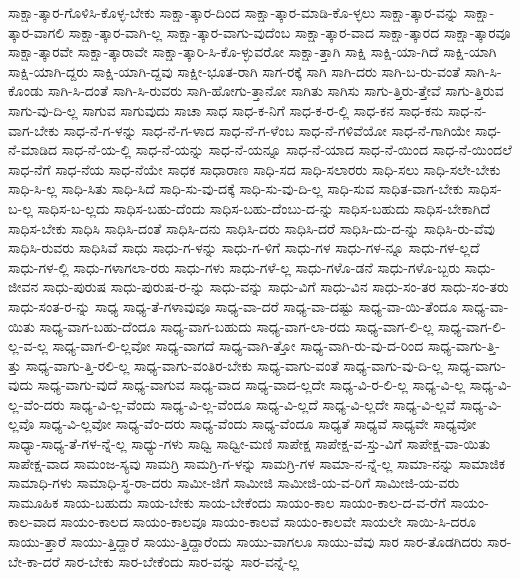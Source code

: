 {ಸಾಕ್ಷಾ-ತ್ಕಾರ-ಗೊಳಿಸಿ-ಕೊಳ್ಳ-ಬೇಕು
ಸಾಕ್ಷಾ-ತ್ಕಾರ-ದಿಂದ
ಸಾಕ್ಷಾ-ತ್ಕಾರ-ಮಾಡಿ-ಕೊ-ಳ್ಳಲು
ಸಾಕ್ಷಾ-ತ್ಕಾರ-ವನ್ನು
ಸಾಕ್ಷಾ-ತ್ಕಾರ-ವಾಗಲಿ
ಸಾಕ್ಷಾ-ತ್ಕಾರ-ವಾಗಿ-ಲ್ಲ
ಸಾಕ್ಷಾ-ತ್ಕಾರ-ವಾಗು-ವುದೆಂಬ
ಸಾಕ್ಷಾ-ತ್ಕಾರ-ವಾದ
ಸಾಕ್ಷಾ-ತ್ಕಾರದ
ಸಾಕ್ಷಾ-ತ್ಕಾರವೂ
ಸಾಕ್ಷಾ-ತ್ಕಾರವೇ
ಸಾಕ್ಷಾ-ತ್ಕಾರಾವೇ
ಸಾಕ್ಷಾ-ತ್ಕಾರಿ-ಸಿ-ಕೊ-ಳ್ಳುವರೋ
ಸಾಕ್ಷಾ-ತ್ತಾಗಿ
ಸಾಕ್ಷಿ
ಸಾಕ್ಷಿ-ಯಾ-ಗಿದೆ
ಸಾಕ್ಷಿ-ಯಾಗಿ
ಸಾಕ್ಷಿ-ಯಾಗಿ-ದ್ದರು
ಸಾಕ್ಷಿ-ಯಾಗಿ-ದ್ದವು
ಸಾಕ್ಷೀ-ಭೂತ-ರಾಗಿ
ಸಾಗ-ರಕ್ಕೆ
ಸಾಗಿ
ಸಾಗಿ-ದರು
ಸಾಗಿ-ಬ-ರು-ವಂತೆ
ಸಾಗಿ-ಸಿ-ಕೊಂಡು
ಸಾಗಿ-ಸಿ-ದಂತೆ
ಸಾಗಿ-ಸಿ-ರುವರು
ಸಾಗಿ-ಹೋಗು-ತ್ತಾನೋ
ಸಾಗಿತು
ಸಾಗಿಸು
ಸಾಗು-ತ್ತಿರು-ತ್ತೇವೆ
ಸಾಗು-ತ್ತಿರುವ
ಸಾಗು-ವು-ದಿ-ಲ್ಲ
ಸಾಗುವ
ಸಾಗುವುದು
ಸಾಚಾ
ಸಾಧ
ಸಾಧ-ಕ-ನಿಗೆ
ಸಾಧ-ಕ-ರ-ಲ್ಲಿ
ಸಾಧ-ಕನ
ಸಾಧ-ಕನು
ಸಾಧ-ನ-ವಾಗ-ಬೇಕು
ಸಾಧ-ನೆ-ಗ-ಳನ್ನು
ಸಾಧ-ನೆ-ಗ-ಳಾದ
ಸಾಧ-ನೆ-ಗ-ಳೆಂಬ
ಸಾಧ-ನೆ-ಗಳಿವೆಯೋ
ಸಾಧ-ನೆ-ಗಾಗಿಯೇ
ಸಾಧ-ನೆ-ಮಾಡಿದ
ಸಾಧ-ನೆ-ಯ-ಲ್ಲಿ
ಸಾಧ-ನೆ-ಯನ್ನು
ಸಾಧ-ನೆ-ಯನ್ನೂ
ಸಾಧ-ನೆ-ಯಾದ
ಸಾಧ-ನೆ-ಯಿಂದ
ಸಾಧ-ನೆ-ಯಿಂದಲೆ
ಸಾಧ-ನೆಗೆ
ಸಾಧ-ನೆಯ
ಸಾಧ-ನೆಯೇ
ಸಾಧಕ
ಸಾಧಾರಾಣ
ಸಾಧಿ-ಸದ
ಸಾಧಿ-ಸಲಾರರು
ಸಾಧಿ-ಸಲು
ಸಾಧಿ-ಸಲೇ-ಬೇಕು
ಸಾಧಿ-ಸಿ-ಲ್ಲ
ಸಾಧಿ-ಸಿತು
ಸಾಧಿ-ಸಿದೆ
ಸಾಧಿ-ಸು-ವು-ದಕ್ಕೆ
ಸಾಧಿ-ಸು-ವು-ದಿ-ಲ್ಲ
ಸಾಧಿ-ಸುವ
ಸಾಧಿತ-ವಾಗ-ಬೇಕು
ಸಾಧಿಸ-ಬ-ಲ್ಲ
ಸಾಧಿಸ-ಬ-ಲ್ಲದು
ಸಾಧಿಸ-ಬಹು-ದೆಂದು
ಸಾಧಿಸ-ಬಹು-ದೆಂಬು-ದ-ನ್ನು
ಸಾಧಿಸ-ಬಹುದು
ಸಾಧಿಸ-ಬೇಕಾಗಿದೆ
ಸಾಧಿಸ-ಬೇಕು
ಸಾಧಿಸಿ
ಸಾಧಿಸಿ-ದಂತೆ
ಸಾಧಿಸಿ-ದನು
ಸಾಧಿಸಿ-ದರು
ಸಾಧಿಸಿ-ದರೆ
ಸಾಧಿಸಿ-ದು-ದ-ನ್ನು
ಸಾಧಿಸಿ-ರು-ವೆವು
ಸಾಧಿಸಿ-ರುವರು
ಸಾಧಿಸಿವೆ
ಸಾಧು
ಸಾಧು-ಗ-ಳನ್ನು
ಸಾಧು-ಗ-ಳಿಗೆ
ಸಾಧು-ಗಳ
ಸಾಧು-ಗಳ-ನ್ನೂ
ಸಾಧು-ಗಳ-ಲ್ಲದೆ
ಸಾಧು-ಗಳ-ಲ್ಲಿ
ಸಾಧು-ಗಳಾಗಲಾ-ರರು
ಸಾಧು-ಗಳು
ಸಾಧು-ಗಳೆ-ಲ್ಲ
ಸಾಧು-ಗಳೊ-ಡನೆ
ಸಾಧು-ಗಳೊ-ಬ್ಬರು
ಸಾಧು-ಜೀವನ
ಸಾಧು-ಪುರುಷ
ಸಾಧು-ಪುರುಷ-ರ-ನ್ನು
ಸಾಧು-ವನ್ನು
ಸಾಧು-ವಿಗೆ
ಸಾಧು-ವಿನ
ಸಾಧು-ಸಂ-ತರ
ಸಾಧು-ಸಂ-ತರು
ಸಾಧು-ಸಂತ-ರ-ನ್ನು
ಸಾಧ್ಯ
ಸಾಧ್ಯ-ತೆ-ಗಳಾವುವೂ
ಸಾಧ್ಯ-ವಾ-ದರೆ
ಸಾಧ್ಯ-ವಾ-ದಷ್ಟು
ಸಾಧ್ಯ-ವಾ-ಯಿ-ತೆಂದೂ
ಸಾಧ್ಯ-ವಾ-ಯಿತು
ಸಾಧ್ಯ-ವಾಗ-ಬಹು-ದೆಂದೂ
ಸಾಧ್ಯ-ವಾಗ-ಬಹುದು
ಸಾಧ್ಯ-ವಾಗ-ಲಾ-ರದು
ಸಾಧ್ಯ-ವಾಗ-ಲಿ-ಲ್ಲ
ಸಾಧ್ಯ-ವಾಗ-ಲಿ-ಲ್ಲ-ವ-ಲ್ಲ
ಸಾಧ್ಯ-ವಾಗ-ಲಿ-ಲ್ಲವೋ
ಸಾಧ್ಯ-ವಾಗದೆ
ಸಾಧ್ಯ-ವಾಗಿ-ತ್ತೋ
ಸಾಧ್ಯ-ವಾಗಿ-ರು-ವು-ದ-ರಿಂದ
ಸಾಧ್ಯ-ವಾಗು-ತ್ತಿ-ತ್ತು
ಸಾಧ್ಯ-ವಾಗು-ತ್ತಿ-ರಲಿ-ಲ್ಲ
ಸಾಧ್ಯ-ವಾಗು-ವಂತಿರ-ಬೇಕು
ಸಾಧ್ಯ-ವಾಗು-ವಂತೆ
ಸಾಧ್ಯ-ವಾಗು-ವು-ದಿ-ಲ್ಲ
ಸಾಧ್ಯ-ವಾಗು-ವುದು
ಸಾಧ್ಯ-ವಾಗು-ವುದೆ
ಸಾಧ್ಯ-ವಾಗುವ
ಸಾಧ್ಯ-ವಾದ
ಸಾಧ್ಯ-ವಾದ-ಲ್ಲದೇ
ಸಾಧ್ಯ-ವಿ-ರ-ಲಿ-ಲ್ಲ
ಸಾಧ್ಯ-ವಿ-ಲ್ಲ
ಸಾಧ್ಯ-ವಿ-ಲ್ಲ-ವೆಂ-ದರು
ಸಾಧ್ಯ-ವಿ-ಲ್ಲ-ವೆಂದು
ಸಾಧ್ಯ-ವಿ-ಲ್ಲ-ವೆಂದೂ
ಸಾಧ್ಯ-ವಿ-ಲ್ಲದೆ
ಸಾಧ್ಯ-ವಿ-ಲ್ಲದೇ
ಸಾಧ್ಯ-ವಿ-ಲ್ಲವೆ
ಸಾಧ್ಯ-ವಿ-ಲ್ಲವೊ
ಸಾಧ್ಯ-ವಿ-ಲ್ಲವೋ
ಸಾಧ್ಯ-ವೆಂ-ದರು
ಸಾಧ್ಯ-ವೆಂದು
ಸಾಧ್ಯ-ವೆಂದೂ
ಸಾಧ್ಯತೆ
ಸಾಧ್ಯವೆ
ಸಾಧ್ಯವೇ
ಸಾಧ್ಯವೋ
ಸಾಧ್ಯಾ-ಸಾಧ್ಯ-ತೆ-ಗಳ-ನ್ನೆ-ಲ್ಲ
ಸಾಧ್ಯು-ಗಳು
ಸಾಧ್ವಿ
ಸಾಧ್ವೀ-ಮಣಿ
ಸಾಪೇಕ್ಷ
ಸಾಪೇಕ್ಷ-ವ-ಸ್ತು-ವಿಗೆ
ಸಾಪೇಕ್ಷ-ವಾ-ಯಿತು
ಸಾಪೇಕ್ಷ-ವಾದ
ಸಾಮಂಜ-ಸ್ಯವು
ಸಾಮಗ್ರಿ
ಸಾಮಗ್ರಿ-ಗ-ಳನ್ನು
ಸಾಮಗ್ರಿ-ಗಳ
ಸಾಮಾ-ನ-ನ್ನೆ-ಲ್ಲ
ಸಾಮಾ-ನನ್ನು
ಸಾಮಾಜಿಕ
ಸಾಮಾಧಿ-ಗಳು
ಸಾಮಾಧಿ-ಸ್ಥ-ರಾ-ದರು
ಸಾಮೀ-ಜಿಗೆ
ಸಾಮೀಜಿ
ಸಾಮೀಜಿ-ಯ-ವ-ರಿಗೆ
ಸಾಮೀಜಿ-ಯ-ವರು
ಸಾಮೂಹಿಕ
ಸಾಯ-ಬಹುದು
ಸಾಯ-ಬೇಕು
ಸಾಯ-ಬೇಕೆಂದು
ಸಾಯಂ-ಕಾಲ
ಸಾಯಂ-ಕಾಲ-ದ-ವ-ರೆಗೆ
ಸಾಯಂ-ಕಾಲ-ವಾದ
ಸಾಯಂ-ಕಾಲದ
ಸಾಯಂ-ಕಾಲವೂ
ಸಾಯಂ-ಕಾಲವೆ
ಸಾಯಂ-ಕಾಲವೇ
ಸಾಯಲೇ
ಸಾಯಿ-ಸಿ-ದರೂ
ಸಾಯು-ತ್ತಾರೆ
ಸಾಯು-ತ್ತಿದ್ದಾರೆ
ಸಾಯು-ತ್ತಿದ್ದಾರೆಂದು
ಸಾಯು-ವಾಗಲೂ
ಸಾಯು-ವೆವು
ಸಾರ
ಸಾರ-ತೊಡಗಿದರು
ಸಾರ-ಬೇ-ಕಾ-ದರೆ
ಸಾರ-ಬೇಕು
ಸಾರ-ಬೇಕೆಂದು
ಸಾರ-ವನ್ನು
ಸಾರ-ವನ್ನೆ-ಲ್ಲ
}
